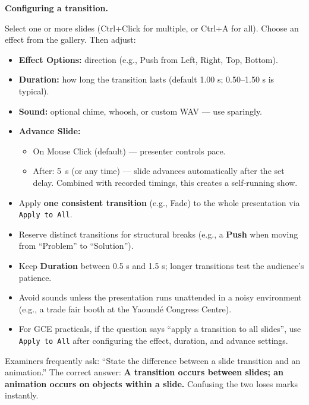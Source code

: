 \documentclass[11pt]{article}
\newcommand{\cle}[1]{{\popxbold\color{popdark}#1}}
\begin{document}
\textbf{Configuring a transition.}\par
Select one or more slides (Ctrl+Click for multiple, or Ctrl+A for all). Choose an effect from the gallery. Then adjust:
\begin{itemize}
\item \textbf{Effect Options:} direction (e.g., Push from Left, Right, Top, Bottom).
\item \textbf{Duration:} how long the transition lasts (default 1.00 s; 0.50–1.50 s is typical).
\item \textbf{Sound:} optional chime, whoosh, or custom WAV — use sparingly.
\item \textbf{Advance Slide:}
      \begin{itemize}
      \item \cle{On Mouse Click} (default) — presenter controls pace.
      \item \cle{After:} \SI{5}{s} (or any time) — slide advances automatically after the set delay. Combined with recorded timings, this creates a self‑running show.
      \end{itemize}
\end{itemize}

\begin{aretenir}
\begin{itemize}
\item Apply \textbf{one consistent transition} (e.g., Fade) to the whole presentation via \texttt{Apply to All}.
\item Reserve distinct transitions for structural breaks (e.g., a \textbf{Push} when moving from “Problem” to “Solution”).
\item Keep \textbf{Duration} between 0.5 s and 1.5 s; longer transitions test the audience’s patience.
\item Avoid sounds unless the presentation runs unattended in a noisy environment (e.g., a trade fair booth at the Yaoundé Congress Centre).
\item For GCE practicals, if the question says “apply a transition to all slides”, use \texttt{Apply to All} after configuring the effect, duration, and advance settings.
\end{itemize}
\end{aretenir}

\begin{attention}
Examiners frequently ask: “State the difference between a slide transition and an animation.” The correct answer: \textbf{A transition occurs between slides; an animation occurs on objects within a slide.} Confusing the two loses marks instantly.
\end{attention}
\end{document}
